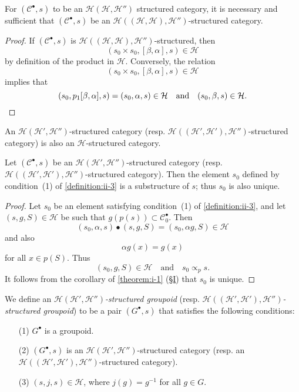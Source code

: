 \documentclass[a4paper,fleqn]{article}
\theoremstyle{plain}
\newenvironment{proposition}[1]
  {\renewcommand\theinnerproposition{#1}\innerproposition}
  {\endinnerproposition}
\theoremstyle{definition}
\newenvironment{definition}[1]
  {\renewcommand\theinnerdefinition{#1}\innerdefinition}
  {\endinnerdefinition}
\newcommand{\textand}{\quad\text{and}\quad}
\newcommand{\CC}{\mathcal{C}}
\newcommand{\HH}{\mathcal{H}}
\newcommand{\subs}{\mathrel{\propto}}
\begin{document}
\begin{proposition}{5}
\label{proposition:ii-5}
  For $(\CC^\bullet,s)$ to be an $\HH(\HH,\HH'')$ structured category, it is necessary and sufficient that $(\CC^\bullet,s)$ be an $\HH((\HH,\HH),\HH'')$-structured category.
\end{proposition}

\begin{proof}
  If $(\CC^\bullet,s)$ is $\HH((\HH,\HH),\HH'')$-structured, then
  \[
    (s_0\times s_0,[\beta,\alpha],s)
    \in\HH
  \]
  by definition of the product in $\HH$.
  Conversely, the relation
  \[
    (s_0\times s_0,[\beta,\alpha],s)
    \in\HH
  \]
  implies that
  \[
    (s_0,p_1[\beta,\alpha],s)
    = (s_0,\alpha,s)\in\HH
    \textand
    (s_0,\beta,s)
    \in\HH.
    \qedhere
  \]
\end{proof}

An $\HH(\HH',\HH'')$-structured category (resp. $\HH((\HH',\HH'),\HH'')$-structured category) is also an $\HH$-structured category.

\begin{proposition}{6}
\label{proposition:ii-6}
  Let $(\CC^\bullet,s)$ be an $\HH(\HH',\HH'')$-structured category (resp. $\HH((\HH',\HH'),\HH'')$-structured category).
  Then the element $s_0$ defined by condition~(1) of \cref{definition:ii-3} is a substructure of $s$; thus $s_0$ is also unique.
\end{proposition}

\begin{proof}
  Let $s_0$ be an element satisfying condition~(1) of \cref{definition:ii-3}, and let $(s,g,S)\in\HH$ be such that $g(p(s))\subset\CC_0^\bullet$.
  Then
  \[
    (s_0,\alpha,s)\bullet(s,g,S)
    = (s_0,\alpha g,S)\in\HH
  \]
  and also
  \[
    \alpha g(x)
    = g(x)
  \]
  for all $x\in p(S)$.
  Thus
  \[
    (s_0,g,S)\in\HH
    \textand
    s_0\subs_p s.
  \]
  It follows from the corollary of \cref{theorem:i-1} (\hyperref[section:i]{§I}) that $s_0$ is unique.
\end{proof}

\begin{definition}{4}
\label{definition:ii-4}
  We define an \emph{$\HH(\HH',\HH'')$-structured groupoid} (resp. \emph{$\HH((\HH',\HH'),\HH'')$-structured groupoid}) to be a pair $(G^\bullet,s)$ that satisfies the following conditions:
  \begin{enumerate}
    \item[\normalfont(1)]
      $G^\bullet$ is a groupoid.

    \item[\normalfont(2)]
      $(G^\bullet,s)$ is an $\HH(\HH',\HH'')$-structured category (resp. an $\HH((\HH',\HH'),\HH'')$-structured category).

    \item[\normalfont(3)]
      $(s,j,s)\in\HH$, where $j(g)=g^{-1}$ for all $g\in G$.
  \end{enumerate}
\end{definition}
\end{document}
